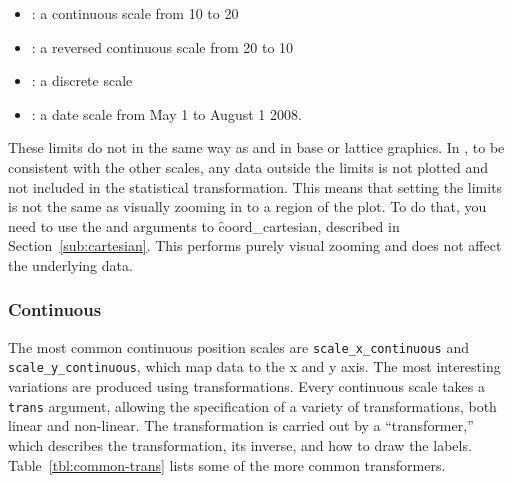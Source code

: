 \begin{itemize}
  \item {}: a continuous scale from 10 to 20
  \item {}: a reversed continuous scale from 20 to 10
  \item {}: a discrete scale
  \item {}: a date scale from May 1 to August 1 2008.
\end{itemize}

These limits do not in the same way as  and  in base or lattice graphics.  In \ggplot, to be consistent with the other scales, any data outside the limits is not plotted and not included in the statistical transformation.  This means that setting the limits is not the same as visually zooming in to a region of the plot.  To do that, you need to use the  and  arguments to \f{coord_cartesian}, described in Section~\ref{sub:cartesian}.  This performs purely visual zooming and does not affect the underlying data.

\subsubsection{Continuous}
\label{sub:scale-continuous}

The most common continuous position scales are {\tt scale\_x\_continuous} and {\tt scale\_y\_continuous}, which map data to the x and y axis.  The most interesting variations are produced using transformations.  Every continuous scale takes a {\tt trans} argument, allowing the specification of a variety of transformations, both linear and non-linear.  The transformation is carried out by a ``transformer,'' which describes the transformation, its inverse, and how to draw the labels. Table~\ref{tbl:common-trans} lists some of the more common transformers.

